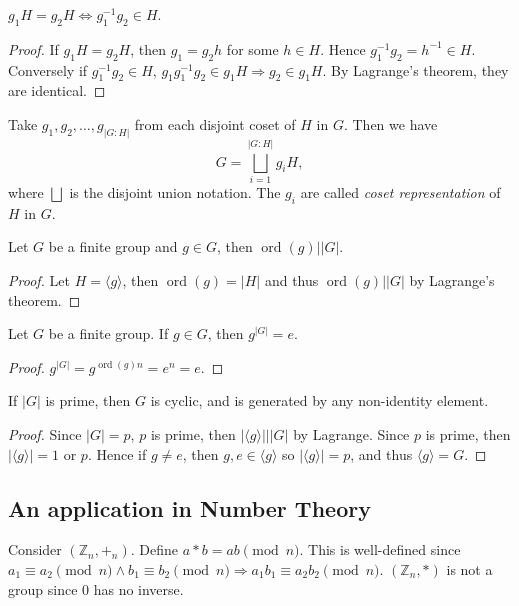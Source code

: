 \documentclass[10pt]{article}
\DeclareMathOperator{\ord}{ord}
\begin{document}
    \begin{proposition}\label{prop:3.4}
        $ g_1H=g_2H \Longleftrightarrow g_1^{-1}g_2\in H $.
    \end{proposition}
    \begin{proof}
        If $ g_1H=g_2H $, then $ g_1=g_2h $ for some $h\in H$. Hence $ g_1^{-1}g_2=h^{-1}\in H $. Conversely if $ g_1^{-1}g_2\in H $, $ g_1 g_1^{-1}g_2\in g_1H \Rightarrow g_2\in g_1H $. By Lagrange's theorem, they are identical.
    \end{proof}
    Take $ g_1,g_2,\dots,g_{|G:H|} $ from each disjoint coset of $H$ in $G$. Then we have 
    \[
        G=\bigsqcup_{i=1}^{|G:H|}g_iH
    ,\]
    where $ \bigsqcup  $ is the disjoint union notation. The $g_i$ are called \textit{coset representation} of $H$ in $G$.
    \begin{corollary}\label{col:3.5}
            Let $G$ be a finite group and $g\in G$, then $ \ord(g)||G| $.
    \end{corollary}
    \begin{proof}
        Let $ H=\langle g \rangle $, then $ \ord(g)=|H| $ and thus $ \ord(g)||G| $ by Lagrange's theorem.
    \end{proof}
    \begin{corollary}\label{col:3.6}
        Let $G$ be a finite group. If $g\in G$, then $ g^{|G|}=e $.
    \end{corollary}
    \begin{proof}
        $ g^{|G|}=g^{\ord(g)n}=e^{n}=e $.
    \end{proof}
    \begin{corollary}\label{col:3.7}
        If $ |G| $ is prime, then $G$ is cyclic, and is generated by any non-identity element.
    \end{corollary}
    \begin{proof}
        Since $ |G|=p $, $p$ is prime, then $ |\langle g \rangle |||G| $ by Lagrange. Since $p$ is prime, then $ |\langle g \rangle |=1 $ or $p$. Hence if $g\neq e$, then $ g,e\in \langle g \rangle  $ so $ |\langle g \rangle |=p $, and thus $ \langle g \rangle =G $.
    \end{proof}
    \subsection{An application in Number Theory}
    Consider $ (\mathbb{Z}_n, +_n) $. Define $ a*b=ab\pmod n $. This is well-defined since $ a_1 \equiv a_2\pmod n \land b_1 \equiv b_2 \pmod n \Rightarrow a_1b_1 \equiv a_2b_2\pmod n $. $ (\mathbb{Z}_n, *) $ is not a group since $0$ has no inverse.
\end{document}
